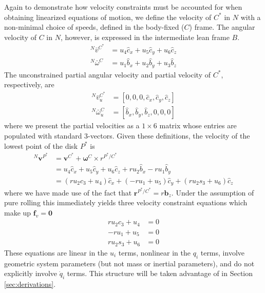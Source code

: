 \documentclass[smallcondensed,final]{svjour3}                     %
\begin{document}
Again to demonstrate how velocity constraints must be accounted for when
obtaining linearized equations of motion, we define the velocity of $C^*$ in
$N$ with a non-minimal choice of speeds, defined in the body-fixed ($C$) frame.
The angular velocity of $C$ in $N$, however, is expressed in the intermediate
lean frame $B$.
\begin{align}
  \label{v_u}
  {^N}\bar{v}^{C^*} &= u_4 \hat{c}_x + u_5 \hat{c}_y + u_6 \hat{c}_z \\
  \label{w_u}
  {^N}\bar{\omega}^C &= u_1 \hat{b}_x + u_2 \hat{b}_y + u_3 \hat{b}_z
\end{align}
The unconstrained partial angular velocity and partial velocity of $C^*$,
respectively, are
\begin{align}
  {^N}\bar{v}^{C^*}_u &= [0, 0, 0, \hat{c}_x, \hat{c}_y, \hat{c}_z] \\
  {^N}\bar{\omega}^C_u &= [\hat{b}_x, \hat{b}_y, \hat{b}_z, 0, 0, 0]
\end{align}
where we present the partial velocities as a $1\times6$ matrix whose entries
are populated with standard 3-vectors. Given these definitions, the velocity of
the lowest point of the disk $P^*$ is
\begin{align*}
    {^N}\bm{v}^{P^*} &= \bm{v}^{C^*} + \bm{\omega}^{C} \times r^{P^*/C^*} \\
                     &= u_4\hat{c}_x + u_5\hat{c}_y + u_6\hat{c}_z + r u_2
                        \hat{b}_x - r u_1 \hat{b}_y \\
                     &= (r u_2 c_3 + u_4) \hat{c}_x + (-r
                        u_1 + u_5)\hat{c}_y + (r u_2 s_3 +
                        u_6) \hat{c}_z
\end{align*}
where we have made use of the fact that $\bm{r}^{P^*/C^*} = r\bm{b}_z$.
Under the assumption of pure rolling this immediately yields three velocity
constraint equations which make up $\mathbf{f}_v = \mathbf{0}$
\begin{subequations}
\label{rd:f_v}
\begin{align}
    r u_2 c_3 + u_4 &= 0\\
            -r u_1 + u_5 &= 0\\
    r u_2 s_3 + u_6 &= 0
\end{align}
\end{subequations}
These equations are linear in the $u_i$ terms, nonlinear in the $q_i$ terms,
involve geometric system parameters (but not mass or inertial parameters), and
do not explicitly involve $\dot{q}_i$ terms. This structure will be taken
advantage of in Section \ref{sec:derivations}.
\end{document}
